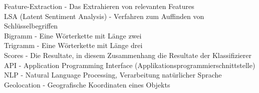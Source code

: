 Feature-Extraction - Das Extrahieren von relevanten Features\\
LSA (Latent Sentiment Analysis) - Verfahren zum Auffinden von Schlüsselbegriffen\\
Bigramm - Eine Wörterkette mit Länge zwei\\
Trigramm - Eine Wörterkette mit Länge drei\\
Scores - Die Resultate, in diesem Zusammenhang die Resultate der Klassifizierer\\
API - Application Programming Interface (Applikationsprogrammierschnittstelle)\\
NLP - Natural Language Processing, Verarbeitung natürlicher Sprache\\
Geolocation - Geografische Koordinaten eines Objekts
